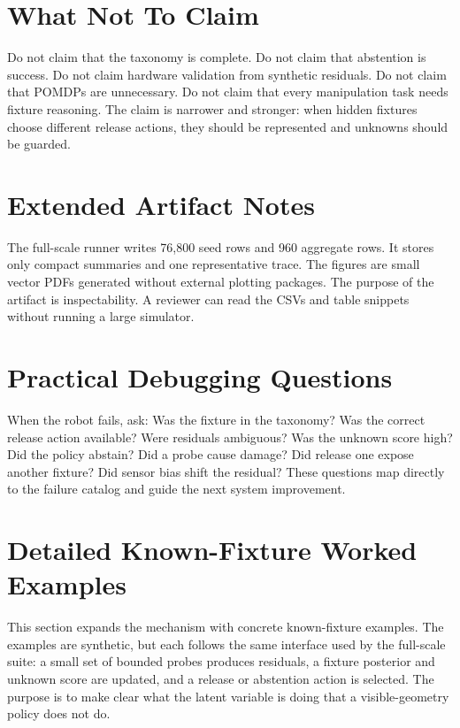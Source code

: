 \documentclass{article}
\begin{document}
\section{What Not To Claim}

Do not claim that the taxonomy is complete. Do not claim that abstention is
success. Do not claim hardware validation from synthetic residuals. Do not
claim that POMDPs are unnecessary. Do not claim that every manipulation task
needs fixture reasoning. The claim is narrower and stronger: when hidden
fixtures choose different release actions, they should be represented and
unknowns should be guarded.

\section{Extended Artifact Notes}

The full-scale runner writes 76,800 seed rows and 960 aggregate rows. It stores
only compact summaries and one representative trace. The figures are small
vector PDFs generated without external plotting packages. The purpose of the
artifact is inspectability. A reviewer can read the CSVs and table snippets
without running a large simulator.

\section{Practical Debugging Questions}

When the robot fails, ask: Was the fixture in the taxonomy? Was the correct
release action available? Were residuals ambiguous? Was the unknown score high?
Did the policy abstain? Did a probe cause damage? Did release one expose
another fixture? Did sensor bias shift the residual? These questions map
directly to the failure catalog and guide the next system improvement.

\section{Detailed Known-Fixture Worked Examples}

This section expands the mechanism with concrete known-fixture examples. The
examples are synthetic, but each follows the same interface used by the
full-scale suite: a small set of bounded probes produces residuals, a fixture
posterior and unknown score are updated, and a release or abstention action is
selected. The purpose is to make clear what the latent variable is doing that a
visible-geometry policy does not do.
\end{document}
